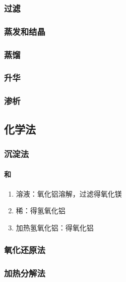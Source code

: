 \documentclass[a4paper]{article}
\begin{document}
	\subsubsection{过滤}
	\subsubsection{蒸发和结晶}
	\subsubsection{蒸馏}
	\subsubsection{升华}
	\subsubsection{渗析}
	\subsection{化学法}
	\subsubsection{沉淀法}
	\paragraph{和}
	\begin{enumerate}
		\item {}溶液：氧化铝溶解，过滤得氧化镁
		\item 稀：得氢氧化铝
		\item 加热氢氧化铝：得氧化铝
	\end{enumerate}
	\subsubsection{氧化还原法}
	\subsubsection{加热分解法}
	
\end{document}
